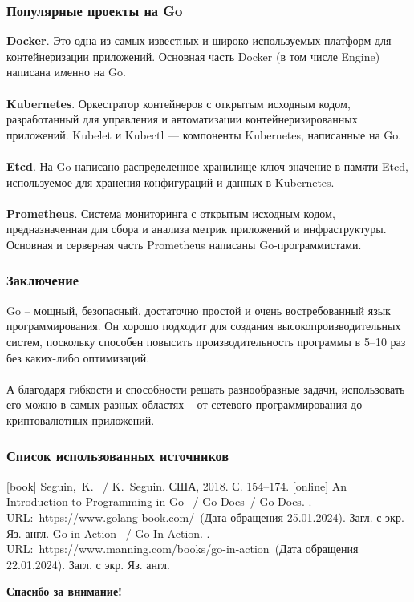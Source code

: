 \documentclass{beamer}
\begin{document}
\begin{frame}[fragile] \frametitle{Популярные проекты на Go}
  \textbf{Docker}. Это одна из самых известных и широко используемых платформ
  для контейнеризации приложений. Основная часть Docker (в том числе Engine)
  написана именно на Go.
  \\\\
  \textbf{Kubernetes}. Оркестратор контейнеров с открытым исходным кодом,
  разработанный для управления и автоматизации контейнеризированных приложений.
  Kubelet и Kubectl — компоненты Kubernetes, написанные на Go.
  \\\\
  \textbf{Etcd}. На Go написано распределенное хранилище ключ-значение в памяти
  Etcd, используемое для хранения конфигураций и данных в Kubernetes.
  \\\\
  \textbf{Prometheus}. Система мониторинга с открытым исходным кодом,
  предназначенная для сбора и анализа метрик приложений и инфраструктуры.
  Основная и серверная часть Prometheus написаны Go-программистами.
\end{frame}
\begin{frame}[fragile] \frametitle{Заключение}
  Go – мощный, безопасный, достаточно простой и очень востребованный язык
  программирования. Он хорошо подходит для создания высокопроизводительных
  систем, поскольку способен повысить производительность программы в 5–10 раз
  без каких-либо оптимизаций. 
  \\\\
  А благодаря гибкости и способности решать разнообразные задачи, использовать
  его можно в самых разных областях – от сетевого программирования до
  криптовалютных приложений.
\end{frame}
\begin{frame}
  \frametitle{Список использованных источников}
  \small
  \begin{thebibliography}{9}
     [book]
     {Seguin,~K.} 
     ~/ K.~Seguin.
     \newblock США,  2018. С. 154--174.
     [online]
      {An Introduction to Programming in Go} 
     ~/ Go Docs~/ Go Docs.
     .
     \newblock URL:~{https://www.golang-book.com/}\
       (Дата обращения 25.01.2024). Загл. с экр. Яз. англ.
      {Go in Action} 
     ~/ Go In Action. 
     .
     \newblock URL:~{https://www.manning.com/books/go-in-action}\ (Дата
       обращения 22.01.2024). Загл. с экр. Яз. англ.
  \end{thebibliography}
\end{frame}
\begin{frame}
\Huge{\centerline{\textbf{Спасибо за внимание!}}}
\end{frame}
\end{document}
